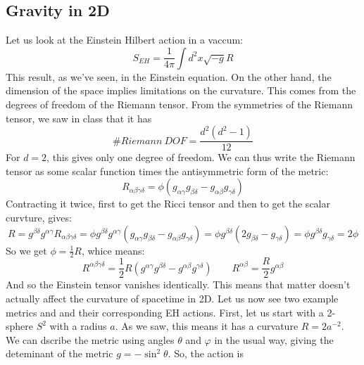 \documentclass{article}
\begin{document}
\subsection{Gravity in 2D}
Let us look at the Einstein Hilbert action in a vaccum:
\begin{equation}
    S_{EH} = \frac{1}{4\pi}\int d^2x\sqrt{-g}R
\end{equation}
This result, as we've seen, in the Einstein equation. On the other hand, the dimension of the space implies limitations on the curvature. This comes from the degrees of freedom of the Riemann tensor. From the symmetries of the Riemann tensor, we saw in class that it has
\begin{equation}
    \# Riemann \ DOF = \frac{d^2\left(d^2-1\right)}{12}
\end{equation}
For $d = 2$, this gives only one degree of freedom. We can thus write the Riemann tensor as some scalar function times the antisymmetric form of the metric:
\begin{equation}
    R_{\alpha\beta\gamma\delta} = \phi \left(g_{\alpha\gamma}g_{\beta\delta} - g_{\alpha\beta}g_{\gamma\delta}\right)
\end{equation}
Contracting it twice, first to get the Ricci tensor and then to get the scalar curvture, gives:
\begin{equation}
    R = g^{\beta\delta}g^{\alpha\gamma}R_{\alpha\beta\gamma\delta} = \phi g^{\beta\delta}g^{\alpha\gamma}\left(g_{\alpha\gamma}g_{\beta\delta} - g_{\alpha\beta}g_{\gamma\delta}\right) = \phi g^{\beta\delta}\left(2g_{\beta\delta} - g_{\gamma\delta}\right) = \phi g^{\beta\delta}g_{\gamma\delta} = 2\phi
\end{equation}
So we get $\phi = \frac{1}{2}R$, whice means:
\begin{equation}
    R^{\alpha\beta\gamma\delta} = \frac{1}{2}R\left(g^{\alpha\gamma}g^{\beta\delta} - g^{\alpha\beta}g^{\gamma\delta}\right)
    \qquad
    R^{\alpha\beta} = \frac{R}{2}g^{\alpha\beta}
\end{equation}
And so the Einstein tensor vanishes identically. This means that matter doesn't actually affect the curvature of spacetime in 2D.
\newline
\newline
Let us now see two example metrics and and their corresponding EH actions. First, let us start with a 2-sphere $S^2$ with a radius $a$. As we saw, this means it has a curvature $R = 2a^{-2}$. We can dscribe the metric using angles $\theta$ and $\varphi$ in the usual way, giving the deteminant of the metric $g = -\sin^2\theta$. So, the action is
\end{document}
